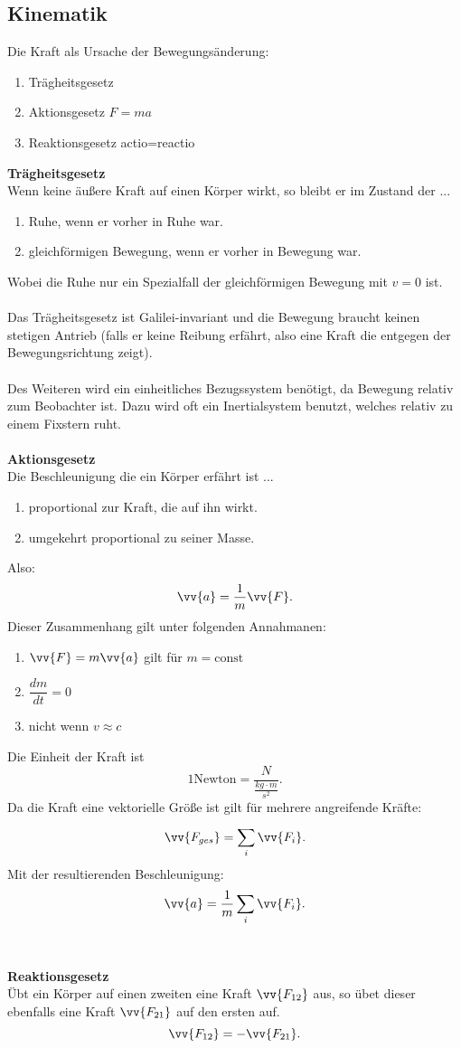 \documentclass[a4paper,12pt]{article}
\numberwithin{equation}{section}
\begin{document}
\subsection{Kinematik}
Die Kraft als Ursache der Bewegungsänderung:
\begin{enumerate}[label=\arabic*.]
        \item Trägheitsgesetz
        \item Aktionsgesetz $F=ma$ 
        \item Reaktionsgesetz actio=reactio
\end{enumerate}
\textbf{Trägheitsgesetz}\\ 
Wenn keine äußere Kraft auf einen Körper wirkt, so bleibt er im Zustand der ...
\begin{enumerate}[label=...]
        \item Ruhe, wenn er vorher in Ruhe war.
        \item gleichförmigen Bewegung, wenn er vorher in Bewegung war.
\end{enumerate}
Wobei die Ruhe nur ein Spezialfall der gleichförmigen Bewegung mit $v=0$ ist.\\\\
Das Trägheitsgesetz ist Galilei-invariant und die Bewegung braucht keinen stetigen Antrieb (falls er keine Reibung erfährt, also eine Kraft die entgegen der Bewegungsrichtung zeigt).\\\\
Des Weiteren wird ein einheitliches Bezugssystem benötigt, da Bewegung relativ zum Beobachter ist. Dazu wird oft ein Inertialsystem benutzt, welches relativ zu einem Fixstern ruht.
\\\hfill\\\textbf{Aktionsgesetz}\\ 
Die Beschleunigung die ein Körper erfährt ist ...
\begin{enumerate}[label=...]
        \item proportional zur Kraft, die auf ihn wirkt.
        \item umgekehrt proportional zu seiner Masse.
\end{enumerate}
Also: \[
        \vv{a}=\dfrac{1}{m}\vv{F}
.\]
Dieser Zusammenhang gilt unter folgenden Annahmanen:
\begin{enumerate}[label=]
        \item $\vv{F}=m\vv{a}$ gilt für $m=\text{const}$ 
        \item $\dfrac{dm}{dt}=0$ 
        \item nicht wenn $v\approx c$ 
\end{enumerate}
Die Einheit der Kraft ist 
\[
        1\text{Newton}=\dfrac{N}{\tfrac{kg\cdot m}{s ^2}}
.\]
Da die Kraft eine vektorielle Größe ist gilt für mehrere angreifende Kräfte:
\[ 
\vv{F_{ges}}=\sum_{i}^{}\vv{F_i}
.\] 
Mit der resultierenden Beschleunigung:
\[ 
\vv{a}=\dfrac{1}{m}\sum_{i}^{}\vv{F_i}
.\] 
\\\hfill\\\textbf{Reaktionsgesetz}\\ 
Übt ein Körper auf einen zweiten eine Kraft $\vv{F_{12}}$ aus, so übet dieser ebenfalls eine Kraft $\vv{F_{21}}$ auf den ersten auf.
\[ 
        \vv{F_{12}}=-\vv{F_{21}}
.\] 
\end{document}
